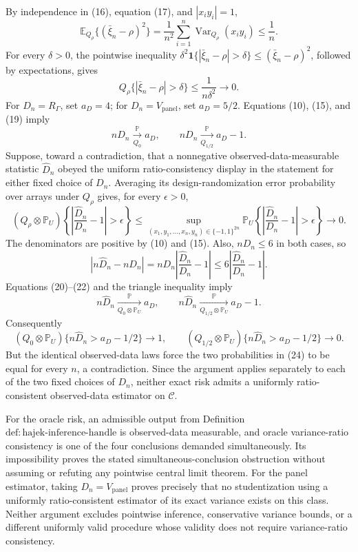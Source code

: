 By independence in (16), equation (17), and \(|x_i y_i|=1\),
\[
\mathbb E_{Q_\rho}\{(\bar\xi_n-\rho)^2\}
=\frac1{n^2}\sum_{i=1}^n\operatorname{Var}_{Q_\rho}(x_i y_i)
\le\frac1n.
\tag{18}
\]
For every \(\delta>0\), the pointwise inequality \(\delta^2\mathbf 1\{|\bar\xi_n-\rho|>\delta\}\le(\bar\xi_n-\rho)^2\), followed by expectations, gives
\[
Q_\rho\{|\bar\xi_n-\rho|>\delta\}
\le\frac1{n\delta^2}\longrightarrow0.
\tag{19}
\]
For \(D_n=R_\Gamma\), set \(a_D=4\); for \(D_n=V_{\mathrm{panel}}\), set \(a_D=5/2\).  Equations (10), (15), and (19) imply
\[
nD_n\xrightarrow[Q_0]{\mathbb P}a_D,
\qquad
nD_n\xrightarrow[Q_{1/2}]{\mathbb P}a_D-1.
\tag{20}
\]
Suppose, toward a contradiction, that a nonnegative observed-data-measurable statistic \(\widehat D_n\) obeyed the uniform ratio-consistency display in the statement for either fixed choice of \(D_n\).  Averaging its design-randomization error probability over arrays under \(Q_\rho\) gives, for every \(\epsilon>0\),
\[
(Q_\rho\otimes\mathbb P_U)
\!\left\{\left|\frac{\widehat D_n}{D_n}-1\right|>\epsilon\right\}
\le
\sup_{(x_1,y_1,\ldots,x_n,y_n)\in\{-1,1\}^{2n}}
\mathbb P_U
\!\left\{\left|\frac{\widehat D_n}{D_n}-1\right|>\epsilon\right\}
\longrightarrow0.
\tag{21}
\]
The denominators are positive by (10) and (15).  Also, \(nD_n\le6\) in both cases, so
\[
|n\widehat D_n-nD_n|
=nD_n\left|\frac{\widehat D_n}{D_n}-1\right|
\le6\left|\frac{\widehat D_n}{D_n}-1\right|.
\tag{22}
\]
Equations (20)--(22) and the triangle inequality imply
\[
n\widehat D_n\xrightarrow[Q_0\otimes\mathbb P_U]{\mathbb P}a_D,
\qquad
n\widehat D_n\xrightarrow[Q_{1/2}\otimes\mathbb P_U]{\mathbb P}a_D-1.
\tag{23}
\]
Consequently
\[
(Q_0\otimes\mathbb P_U)\{n\widehat D_n>a_D-1/2\}\longrightarrow1,
\qquad
(Q_{1/2}\otimes\mathbb P_U)\{n\widehat D_n>a_D-1/2\}\longrightarrow0.
\tag{24}
\]
But the identical observed-data laws force the two probabilities in (24) to be equal for every \(n\), a contradiction.  Since the argument applies separately to each of the two fixed choices of \(D_n\), neither exact risk admits a uniformly ratio-consistent observed-data estimator on \(\mathcal C\).

For the oracle risk, an admissible output from Definition \(\mathrm{def:hajek\text{-}inference\text{-}handle}\) is observed-data measurable, and oracle variance-ratio consistency is one of the four conclusions demanded simultaneously.  Its impossibility proves the stated simultaneous-conclusion obstruction without assuming or refuting any pointwise central limit theorem.  For the panel estimator, taking \(D_n=V_{\mathrm{panel}}\) proves precisely that no studentization using a uniformly ratio-consistent estimator of its exact variance exists on this class.  Neither argument excludes pointwise inference, conservative variance bounds, or a different uniformly valid procedure whose validity does not require variance-ratio consistency.

